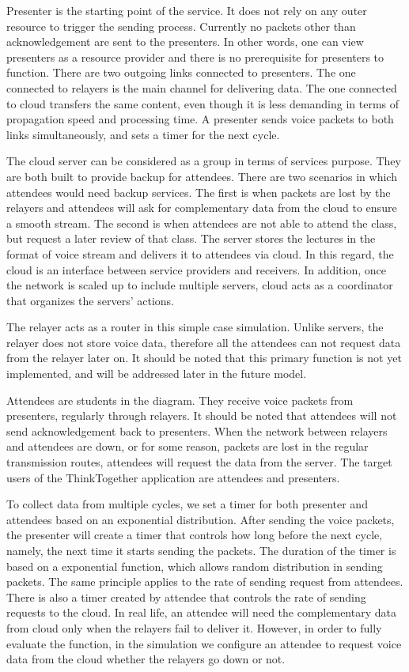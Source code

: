 Presenter is the starting point of the service. It does not rely on any outer
resource to trigger the sending process. Currently no packets other than
acknowledgement are sent to the presenters. In other words, one can view presenters
as a resource provider and there is no prerequisite for presenters to function.
There are two outgoing links connected to presenters. The one connected to
relayers is the main channel for delivering data. The one connected to cloud
transfers the same content, even though it is less demanding in terms of propagation
speed and processing time. A presenter sends voice packets to both links
simultaneously, and sets a timer for the next cycle.

The cloud server can be considered as a group in terms of services
purpose. They are both built to provide backup for attendees. There are two scenarios in
which attendees would need backup services. The first is when packets are lost by the
relayers and attendees will ask for complementary data from the cloud to ensure a
smooth stream. The second is when attendees are not able to attend
the class, but request a later review of that class. The server stores the
lectures in the format of voice stream and delivers it to attendees via cloud.
In this regard, the cloud is an interface between service providers and
receivers. In addition, once the network is scaled up to include multiple servers,
cloud acts as a coordinator that organizes the servers' actions.

The relayer acts as a router in this simple case simulation. Unlike servers,
the relayer
does
not store voice data, therefore all the attendees can not request data from the relayer
later on. It should be noted that this primary function is not yet implemented,
and will be
addressed later in the future model.

Attendees are students in the diagram. They receive voice packets from
presenters, regularly through relayers. It should be noted that attendees will
not send
acknowledgement back to presenters. When the network between relayers and
attendees are down, or for some reason, packets are lost in the regular
transmission routes, attendees will request the data from the server. The
target
users of the ThinkTogether application are attendees and presenters.

To collect data from multiple cycles, we set a timer for both presenter and
attendees based on an exponential distribution. After sending the voice
packets,
the presenter will create a timer that controls how long before the next cycle,
namely, the next time it starts sending the packets. The duration of the timer
is based on a exponential function, which allows random distribution in sending
packets. The same principle applies to the rate of sending request from attendees.
There is also a timer created by attendee that controls the rate of sending
requests to the cloud. In real life, an attendee will need the complementary data from cloud
only when the relayers fail to deliver it. However, in order to fully evaluate the
function, in the simulation we configure an attendee to request voice data from
the cloud whether the relayers go down or not.

